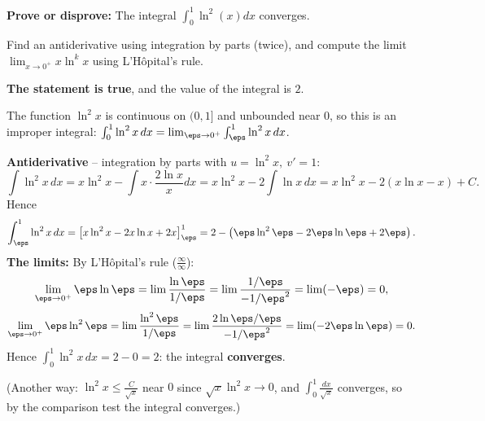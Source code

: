 
\begin{question}
\textbf{Prove or disprove:} The integral $\int_0^1\ln^2(x)dx$ converges.
\end{question}

\begin{hint}
Find an antiderivative using integration by parts (twice), and compute the limit $\lim_{x\to0^+}x\ln^k x$ using L'Hôpital's rule.
\end{hint}

\begin{solution}
\textbf{The statement is true}, and the value of the integral is $2$.

The function $\ln^2x$ is continuous on $(0,1]$ and unbounded near $0$, so this is an improper integral: $\int_0^1\ln^2x\,dx=\lim_{\eps\to0^+}\int_\eps^1\ln^2x\,dx$.

\textbf{Antiderivative} -- integration by parts with $u=\ln^2x,\ v'=1$:
\[ \int\ln^2x\,dx=x\ln^2x-\int x\cdot\frac{2\ln x}{x}dx=x\ln^2x-2\int\ln x\,dx=x\ln^2x-2(x\ln x-x)+C. \]
Hence
\[ \int_\eps^1\ln^2x\,dx=\big[x\ln^2x-2x\ln x+2x\big]_\eps^1=2-\left(\eps\ln^2\eps-2\eps\ln\eps+2\eps\right). \]
\textbf{The limits:} By L'Hôpital's rule ($\frac{\infty}{\infty}$):
\[ \lim_{\eps\to0^+}\eps\ln\eps=\lim\frac{\ln\eps}{1/\eps}=\lim\frac{1/\eps}{-1/\eps^2}=\lim(-\eps)=0, \]
\[ \lim_{\eps\to0^+}\eps\ln^2\eps=\lim\frac{\ln^2\eps}{1/\eps}=\lim\frac{2\ln\eps/\eps}{-1/\eps^2}=\lim(-2\eps\ln\eps)=0. \]
Hence $\int_0^1\ln^2x\,dx=2-0=2$: the integral \textbf{converges}.

(Another way: $\ln^2x\le\frac{C}{\sqrt x}$ near $0$ since $\sqrt x\ln^2x\to0$, and $\int_0^1\frac{dx}{\sqrt x}$ converges, so by the comparison test the integral converges.)
\end{solution}
